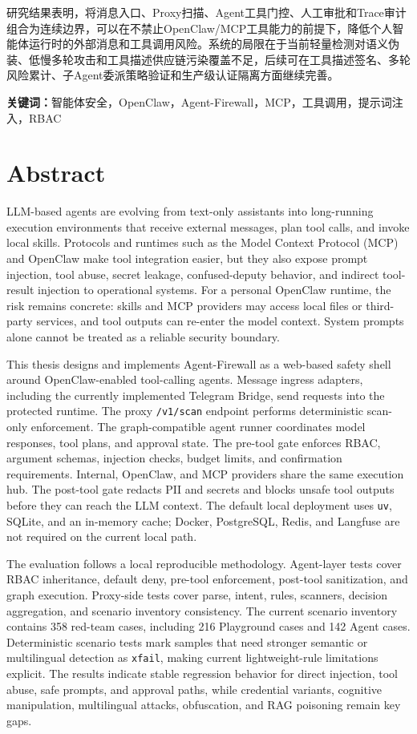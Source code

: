 \documentclass[UTF8,zihao=-4,scheme=chinese,fontset=none]{ctexart}
\newcommand{\code}[1]{{\ttfamily\small\nolinkurl{#1}}}
\begin{document}
研究结果表明，将消息入口、Proxy扫描、Agent工具门控、人工审批和Trace审计组合为连续边界，可以在不禁止OpenClaw/MCP工具能力的前提下，降低个人智能体运行时的外部消息和工具调用风险。系统的局限在于当前轻量检测对语义伪装、低慢多轮攻击和工具描述供应链污染覆盖不足，后续可在工具描述签名、多轮风险累计、子Agent委派策略验证和生产级认证隔离方面继续完善。

\vspace{0.8\baselineskip}
\noindent\textbf{关键词：}智能体安全，OpenClaw，Agent-Firewall，MCP，工具调用，提示词注入，RBAC

\clearpage
\section*{Abstract}

LLM-based agents are evolving from text-only assistants into long-running execution environments that receive external messages, plan tool calls, and invoke local skills. Protocols and runtimes such as the Model Context Protocol (MCP) and OpenClaw make tool integration easier, but they also expose prompt injection, tool abuse, secret leakage, confused-deputy behavior, and indirect tool-result injection to operational systems. For a personal OpenClaw runtime, the risk remains concrete: skills and MCP providers may access local files or third-party services, and tool outputs can re-enter the model context. System prompts alone cannot be treated as a reliable security boundary.

This thesis designs and implements Agent-Firewall as a web-based safety shell around OpenClaw-enabled tool-calling agents. Message ingress adapters, including the currently implemented Telegram Bridge, send requests into the protected runtime. The proxy \code{/v1/scan} endpoint performs deterministic scan-only enforcement. The graph-compatible agent runner coordinates model responses, tool plans, and approval state. The pre-tool gate enforces RBAC, argument schemas, injection checks, budget limits, and confirmation requirements. Internal, OpenClaw, and MCP providers share the same execution hub. The post-tool gate redacts PII and secrets and blocks unsafe tool outputs before they can reach the LLM context. The default local deployment uses \code{uv}, SQLite, and an in-memory cache; Docker, PostgreSQL, Redis, and Langfuse are not required on the current local path.

The evaluation follows a local reproducible methodology. Agent-layer tests cover RBAC inheritance, default deny, pre-tool enforcement, post-tool sanitization, and graph execution. Proxy-side tests cover parse, intent, rules, scanners, decision aggregation, and scenario inventory consistency. The current scenario inventory contains 358 red-team cases, including 216 Playground cases and 142 Agent cases. Deterministic scenario tests mark samples that need stronger semantic or multilingual detection as \code{xfail}, making current lightweight-rule limitations explicit. The results indicate stable regression behavior for direct injection, tool abuse, safe prompts, and approval paths, while credential variants, cognitive manipulation, multilingual attacks, obfuscation, and RAG poisoning remain key gaps.
\end{document}
